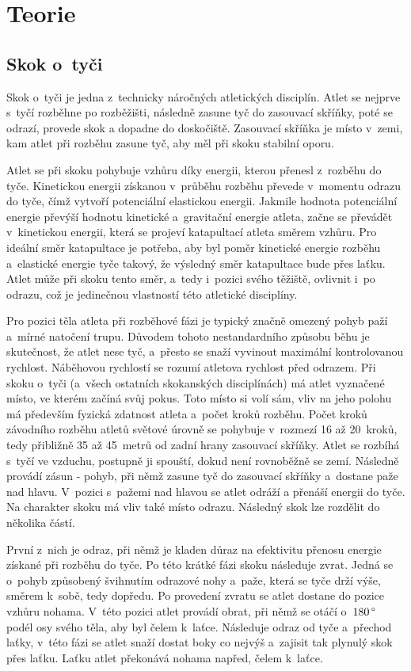 \chapter{Teorie}

\section{Skok o~tyči}

Skok o~tyči je jedna z~technicky náročných atletických disciplín. Atlet se nejprve s~tyčí rozběhne po rozběžišti, následně zasune tyč do zasouvací skříňky, poté se odrazí, provede skok a dopadne do doskočiště. Zasouvací skříňka je místo v~zemi, kam atlet při rozběhu zasune tyč, aby měl při skoku stabilní oporu.

Atlet se při skoku pohybuje vzhůru díky energii, kterou přenesl z~rozběhu do tyče. Kinetickou energii získanou v~průběhu rozběhu převede v~momentu odrazu do tyče, čímž vytvoří potenciální elastickou energii. Jakmile hodnota potenciální energie převýší hodnotu kinetické a~gravitační energie atleta, začne se převádět v~kinetickou energii, která se projeví katapultací atleta směrem vzhůru. Pro ideální směr katapultace je potřeba, aby byl poměr kinetické energie rozběhu a~elastické energie tyče takový, že výsledný směr katapultace bude přes laťku. Atlet může při skoku tento směr, a~tedy i~pozici svého těžiště, ovlivnit i~po odrazu, což je jedinečnou vlastností této atletické disciplíny.

Pro pozici těla atleta při rozběhové fázi je typický značně omezený pohyb paží a~mírné natočení trupu. Důvodem tohoto nestandardního způsobu běhu je skutečnost, že atlet nese tyč, a~přesto se snaží vyvinout maximální kontrolovanou rychlost. Náběhovou rychlostí se rozumí atletova rychlost před odrazem. Při skoku o~tyči (a~všech ostatních skokanských disciplínách) má atlet vyznačené místo, ve kterém začíná svůj pokus. Toto místo si volí sám, vliv na jeho polohu má především fyzická zdatnost atleta a~počet kroků rozběhu. Počet kroků závodního rozběhu atletů světové úrovně se pohybuje v~rozmezí 16 až 20~kroků, tedy přibližně 35 až 45~metrů od zadní hrany zasouvací skříňky. Atlet se rozbíhá s~tyčí ve vzduchu, postupně ji spouští, dokud není rovnoběžně se zemí. Následně provádí zásun - pohyb, při němž zasune tyč do zasouvací skříňky a~dostane paže nad hlavu. V~pozici s~pažemi nad hlavou se atlet odráží a přenáší energii do tyče. Na charakter skoku má vliv také místo odrazu. Následný skok lze rozdělit do několika částí.

První z~nich je odraz, při němž je kladen důraz na efektivitu přenosu energie získané při rozběhu do tyče. Po této krátké fázi skoku následuje zvrat. Jedná se o~pohyb způsobený švihnutím odrazové nohy a~paže, která se tyče drží výše, směrem k~sobě, tedy dopředu. Po provedení zvratu se atlet dostane do pozice vzhůru nohama. V~této pozici atlet provádí obrat, při němž se otáčí o~$180\,\rm \degree$ podél osy svého těla, aby byl čelem k~laťce. Následuje odraz od tyče a~přechod laťky, v~této fázi se atlet snaží dostat boky co nejvýš a~zajisit tak plynulý skok přes laťku. Laťku atlet překonává nohama napřed, čelem k~laťce.

